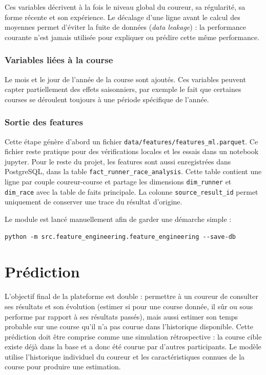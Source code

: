 \documentclass[12pt,a4paper]{article}
\begin{document}
Ces variables décrivent à la fois le niveau global du coureur, sa régularité, sa forme récente et son expérience. Le décalage d'une ligne avant le calcul des moyennes permet d'éviter la fuite de données (\textit{data leakage}) : la performance courante n'est jamais utilisée pour expliquer ou prédire cette même performance.

\subsubsection{Variables liées à la course}

Le mois et le jour de l'année de la course sont ajoutés. Ces variables peuvent capter partiellement des effets saisonniers, par exemple le fait que certaines courses se déroulent toujours à une période spécifique de l'année.

\subsubsection{Sortie des features}

Cette étape génère d'abord un fichier \texttt{data/features/features\_ml.parquet}. Ce fichier reste pratique pour des vérifications locales et les essais dans un notebook jupyter. Pour le reste du projet, les features sont aussi enregistrées dans PostgreSQL, dans la table \texttt{fact\_runner\_race\_analysis}. Cette table contient une ligne par couple coureur-course et partage les dimensions \texttt{dim\_runner} et \texttt{dim\_race} avec la table de faits principale. La colonne \texttt{source\_result\_id} permet uniquement de conserver une trace du résultat d'origine.

Le module est lancé manuellement afin de garder une démarche simple :

\begin{verbatim}
python -m src.feature_engineering.feature_engineering --save-db
\end{verbatim}

\clearpage

\section{Prédiction}

L'objectif final de la plateforme est double : permettre à un coureur de consulter ses résultats et son évolution (estimer si pour une course donnée, il sûr ou sous performe par rapport à ses résultats passés), mais aussi estimer son temps probable sur une course qu'il n'a pas courue dans l'historique disponible. Cette prédiction doit être comprise comme une simulation rétrospective : la course cible existe déjà dans la base et a donc été courue par d'autres participants. Le modèle utilise l'historique individuel du coureur et les caractéristiques connues de la course pour produire une estimation.
\end{document}
